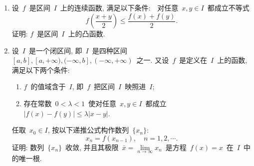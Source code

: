 \documentclass[UTF8,a4paper,20pt]{article}
\begin{document}
\begin{enumerate}[1.]
\item 设~$f$~是区间~$I$~上的连续函数, 满足以下条件:　对任意~$x,y\in I$~都成立不等式
\[ f\left(\dfrac{x+y}{2}\right)\leqslant\dfrac{f(x)+f(y)}{2}. \]
证明: $f$~是区间~$I$~上的凸函数. 

\item 设~$I$~是一个闭区间, 即~$I$~是四种区间~$[a,b], [a,+\infty), (-\infty,b], (-\infty,+\infty)$~之一. 又设~$f$~是定义在~$I$~上的函数, 满足以下两个条件:
	\begin{enumerate}[(1)]
	\item $f$~的值域含于~$I$, 即~$f$~把区间~$I$~映照进~$I$;
	\item 存在常数~$0<\lambda<1$~使对任意~$x,y\in I$~都成立~$|f(x)-f(y)|\leqslant\lambda|x-y|$.
	\end{enumerate}
任取~$x_0\in I$, 按以下递推公式构作数列~$\{x_n\}$:
\[ x_n=f(x_{n-1}), \quad n=1,2,\cdots. \]
证明: 数列~$\{x_n\}$~收敛, 并且其极限~$\bar{x}=\lim\limits_{n\to\infty}x_n$~是方程~$f(x)=x$~在~$I$~中的唯一根.
\end{enumerate}

\clearpage
\end{document}
